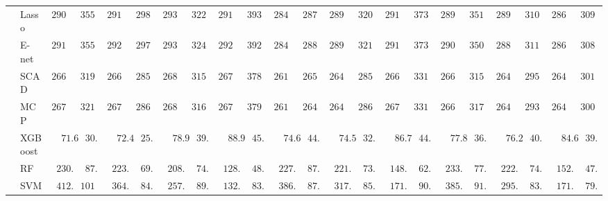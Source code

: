 \begin{tabular}{ll|ll|llllll|llllll|llllll}
 & Lasso  & $2909.34$ & $355.91$ & $2919.02$ & $298.62$ & $2930.73$ & $322.98$ & $2916.61$ & $393.04$ & $2840.92$ & $287.29$ & $2895.79$ & $320.95$ & $2913.09$ & $373.81$ & $2899.60$ & $351.35$ & $2890.65$ & $310.92$ & $2869.77$ & $309.43$ \\
 & E-net  & $2910.20$ & $355.59$ & $2920.01$ & $297.80$ & $2933.67$ & $324.17$ & $2920.77$ & $392.48$ & $2840.37$ & $288.24$ & $2896.64$ & $321.23$ & $2913.46$ & $373.45$ & $2903.22$ & $350.73$ & $2889.01$ & $311.64$ & $2869.83$ & $308.88$ \\
 & SCAD  & $2669.74$ & $319.97$ & $2669.98$ & $285.50$ & $2683.54$ & $315.75$ & $2674.54$ & $378.27$ & $2613.28$ & $265.59$ & $2641.88$ & $285.33$ & $2669.37$ & $331.78$ & $2662.47$ & $315.87$ & $2642.64$ & $295.73$ & $2649.47$ & $301.39$ \\
 & MCP  & $2670.54$ & $321.23$ & $2670.15$ & $286.41$ & $2684.56$ & $316.55$ & $2675.12$ & $379.17$ & $2613.90$ & $264.16$ & $2643.99$ & $286.19$ & $2671.26$ & $331.36$ & $2664.08$ & $317.07$ & $2646.06$ & $293.95$ & $2649.71$ & $300.31$ \\
 & XGBoost  & $\phantom{00}71.61$ & $\phantom{0}30.49$ & $\phantom{00}72.48$ & $\phantom{0}25.89$ & $\phantom{00}78.96$ & $\phantom{0}39.04$ & $\phantom{00}88.96$ & $\phantom{0}45.11$ & $\phantom{00}74.60$ & $\phantom{0}44.15$ & $\phantom{00}74.58$ & $\phantom{0}32.46$ & $\phantom{00}86.77$ & $\phantom{0}44.52$ & $\phantom{00}77.80$ & $\phantom{0}36.14$ & $\phantom{00}76.24$ & $\phantom{0}40.18$ & $\phantom{00}84.65$ & $\phantom{0}39.51$ \\
 & RF  & $\phantom{0}230.96$ & $\phantom{0}87.62$ & $\phantom{0}223.44$ & $\phantom{0}69.22$ & $\phantom{0}208.00$ & $\phantom{0}74.51$ & $\phantom{0}128.85$ & $\phantom{0}48.22$ & $\phantom{0}227.64$ & $\phantom{0}87.04$ & $\phantom{0}221.12$ & $\phantom{0}73.08$ & $\phantom{0}148.76$ & $\phantom{0}62.59$ & $\phantom{0}233.35$ & $\phantom{0}77.15$ & $\phantom{0}222.54$ & $\phantom{0}74.22$ & $\phantom{0}152.12$ & $\phantom{0}47.85$ \\
 & SVM  & $\phantom{0}412.21$ & $101.23$ & $\phantom{0}364.13$ & $\phantom{0}84.15$ & $\phantom{0}257.55$ & $\phantom{0}89.05$ & $\phantom{0}132.26$ & $\phantom{0}83.16$ & $\phantom{0}386.81$ & $\phantom{0}87.26$ & $\phantom{0}317.43$ & $\phantom{0}85.82$ & $\phantom{0}171.73$ & $\phantom{0}90.10$ & $\phantom{0}385.23$ & $\phantom{0}91.51$ & $\phantom{0}295.24$ & $\phantom{0}83.96$ & $\phantom{0}171.48$ & $\phantom{0}79.94$ \\
\hline 
\end{tabular}

